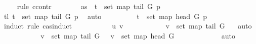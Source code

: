 \begin{isabellebody}
\ \ \ \ \isamarkupfalse%
{\isacharparenleft}{\kern0pt}rule\ ccontr{\isacharparenright}{\kern0pt}\isanewline
\ \ \ \ \ \ \isamarkupfalse%
\ as{}{\isacharcolon}{\kern0pt}\ {\isachardoublequoteopen}{\isasymnot}\ t\ {\isasymnotin}\ set\ {\isacharparenleft}{\kern0pt}map\ {\isacharparenleft}{\kern0pt}tail\ G{\isacharparenright}{\kern0pt}\ p{\isacharparenright}{\kern0pt}{\isachardoublequoteclose}\isanewline
\ \ \ \ \ \ \isamarkupfalse%
\ \isamarkupfalse%
\ tl{}{\isacharcolon}{\kern0pt}\ {\isachardoublequoteopen}t\ {\isasymin}\ set\ {\isacharparenleft}{\kern0pt}map\ {\isacharparenleft}{\kern0pt}tail\ G{\isacharparenright}{\kern0pt}\ p{\isacharparenright}{\kern0pt}{\isachardoublequoteclose}\ \isamarkupfalse%
\ auto\isanewline
\ \ \ \ \ \ \isamarkupfalse%
\ \isamarkupfalse%
\ {\isachardoublequoteopen}t\ {\isasymin}\ set\ {\isacharparenleft}{\kern0pt}map\ {\isacharparenleft}{\kern0pt}head\ G{\isacharparenright}{\kern0pt}\ p{\isacharparenright}{\kern0pt}{\isachardoublequoteclose}\isanewline
\ \ \ \ \ \ \isamarkupfalse%
\ {\isacharparenleft}{\kern0pt}induct\ rule{\isacharcolon}{\kern0pt}\ cas{\isachardot}{\kern0pt}induct{\isacharparenright}{\kern0pt}\isanewline
\ \ \ \ \ \ \ \ \isamarkupfalse%
\ {\isacharparenleft}{\kern0pt}{}\ u\ v{\isacharparenright}{\kern0pt}\isanewline
\ \ \ \ \ \ \ \ \isamarkupfalse%
\ \isamarkupfalse%
\ {\isachardoublequoteopen}v\ {\isasymnotin}\ set\ {\isacharparenleft}{\kern0pt}map\ {\isacharparenleft}{\kern0pt}tail\ G{\isacharparenright}{\kern0pt}\ {\isacharbrackleft}{\kern0pt}{\isacharbrackright}{\kern0pt}{\isacharparenright}{\kern0pt}{\isachardoublequoteclose}\ \isamarkupfalse%
\ auto\isanewline
\ \ \ \ \ \ \ \ \isamarkupfalse%
\ \isamarkupfalse%
\ {\isachardoublequoteopen}v\ {\isasymin}\ set\ {\isacharparenleft}{\kern0pt}map\ {\isacharparenleft}{\kern0pt}tail\ G{\isacharparenright}{\kern0pt}\ {\isacharbrackleft}{\kern0pt}{\isacharbrackright}{\kern0pt}{\isacharparenright}{\kern0pt}\ {\isasymLongrightarrow}\ v\ {\isasymin}\ set\ {\isacharparenleft}{\kern0pt}map\ {\isacharparenleft}{\kern0pt}head\ G{\isacharparenright}{\kern0pt}\ {\isacharbrackleft}{\kern0pt}{\isacharbrackright}{\kern0pt}{\isacharparenright}{\kern0pt}{\isachardoublequoteclose}\isanewline
\ \ \ \ \ \ \ \ \ \ \isamarkupfalse%
\ auto\isanewline
\ \ \ \ \ \ \isamarkupfalse%
\isanewline

\end{isabellebody}
